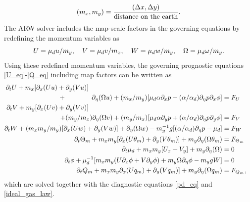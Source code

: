 \begin{equation}
(m_x,m_y) = {(\Delta x, \Delta y) \over \hbox{distance on the earth}}.
\label{map_scale}
\end{equation}
%
\noindent
The ARW solver includes the map-scale factors in the governing equations
by redefining the momentum variables as
%
\begin{equation}
U = {\mu}_d u/m_y,~~~V = {\mu}_d v/m_x, ~~~W = \mu_d w / m_y, 
~~~\Omega = \mu_d \omega /m_y.
\notag
\end{equation}
%
\noindent
Using these redefined momentum variables, 
the governing prognostic equations \eqref{U_eq}-\eqref{Q_eq} including map factors 
can be written as
%
\begin{align}
\partial_t U + m_x[\partial_x(Uu) + \partial_y(Vu)] \hphantom{\quad\quad\quad\quad\quad\quad\quad\quad\quad\quad\quad\quad\quad\quad\quad\quad\quad\quad\quad\quad}
\notag \\ 
+ \hphantom{(m_y/m_x)} 
\partial_\eta (\Omega u)
+ (m_x/m_y)[\mu_d \alpha \partial_x p
+ (\alpha/\alpha_d) \partial_\eta p \partial_x \phi] & = F_U
\label{u-mom-full}
\\
%
\partial_t V + m_y[\partial_x (Uv) + \partial_y (Vv)] \hphantom{\quad\quad\quad\quad\quad\quad\quad\quad\quad\quad\quad\quad\quad\quad\quad\quad\quad\quad\quad\quad}
\notag \\ + (m_y/m_x)\partial_\eta (\Omega v)
+ (m_y/m_x)[\mu_d \alpha \partial_y p
+ (\alpha/\alpha_d) \partial_\eta p \partial_y \phi] & = F_V
\label{v-mom-full}
\\
%
\partial_t W + (m_x m_y/m_y) [\partial_x (Uw) + \partial_y (Vw)] + \partial_\eta (\Omega w)
- m_y^{-1} g [ (\alpha/\alpha_d) \partial_\eta p - \mu_d ] & = F_W 
\label{w-mom-full}
\\
%
\partial_t \Theta_m + 
m_x m_y[\partial_x (U\theta_m) + \partial_y (V\theta_m)] + m_y \partial_\eta (\Omega \theta_m)
& = F_{\Theta_m} 
\label{tm_full} \\
%
\partial_t \mu_d + m_x m_y[U_x + V_y] + m_y \partial_\eta (\Omega)
& = 0 
\label{mass-cons-full}
\\
%
\partial_t \phi + \mu_d^{-1} [m_x m_y (U\partial_x\phi + V\partial_y\phi) + m_y
\Omega\partial_\eta\phi - m_y gW ] & = 0
\label{geo-full}
\\
%
\partial_t Q_m + 
m_x m_y \partial_x (U q_m) + \partial_y (V q_m)] + m _y\partial_\eta (\Omega q_m)
& = F_{Q_m},
\label{qm_full}%
\end{align}
\noindent
which are solved together with the diagnostic equations \eqref{pd_eq} and \eqref{ideal_gas_law}.
%
%
\noindent
%
%

